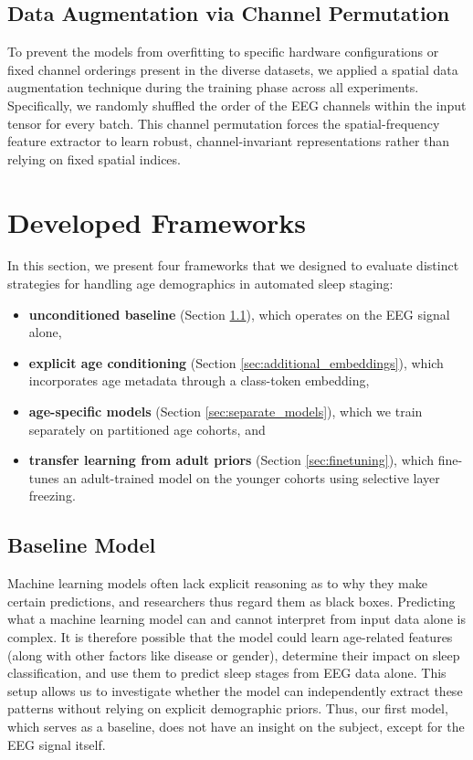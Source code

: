 \subsection{Data Augmentation via Channel Permutation}
To prevent the models from overfitting to specific hardware configurations or fixed channel orderings present in the diverse datasets, we applied a spatial data augmentation technique during the training phase across all experiments. Specifically, we randomly shuffled the order of the EEG channels within the input tensor for every batch. This channel permutation forces the spatial-frequency feature extractor to learn robust, channel-invariant representations rather than relying on fixed spatial indices.

\section{Developed Frameworks} \label{sec:developed_frameworks}
In this section, we present four frameworks that we designed to evaluate distinct strategies for handling age demographics in automated sleep staging:
\begin{itemize}
    \item \textbf{unconditioned baseline} (Section \ref{sec:baseline_model}), which operates on the EEG signal alone,
    \item \textbf{explicit age conditioning} (Section \ref{sec:additional_embeddings}), which incorporates age metadata through a class-token embedding,
    \item \textbf{age-specific models} (Section \ref{sec:separate_models}), which we train separately on partitioned age cohorts, and
    \item \textbf{transfer learning from adult priors} (Section \ref{sec:finetuning}), which fine-tunes an adult-trained model on the younger cohorts using selective layer freezing.
\end{itemize}
\subsection{Baseline Model} \label{sec:baseline_model}
Machine learning models often lack explicit reasoning as to why they make certain
predictions, and researchers thus regard them as black boxes. Predicting what a machine learning model
can and cannot interpret from input data alone is complex. It is therefore possible that the
model could learn age-related features (along with other factors like disease or
gender), determine their impact on sleep classification, and use them to predict sleep stages
from EEG data alone. This setup allows us to investigate whether the model can independently
extract these patterns without relying on explicit demographic priors.
Thus, our first model, which serves as a baseline,
does not have an insight on the subject, except for the EEG signal itself.

